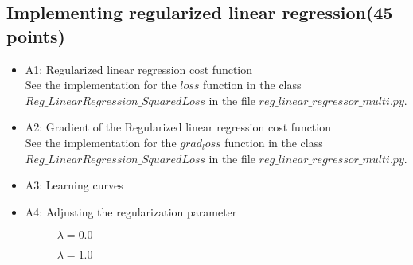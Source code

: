 \documentclass{article}
\begin{document}
\subsection{Implementing regularized linear regression(45 points)}
\begin{itemize}
    \item A1: Regularized linear regression cost function\\
    See the implementation for the $loss$ function in the class $Reg\_LinearRegression\_SquaredLoss$ in the file $reg\_linear\_regressor\_multi.py$.\\
    \item A2: Gradient of the Regularized linear regression cost function\\
    See the implementation for the $grad_loss$ function in the class $Reg\_LinearRegression\_SquaredLoss$ in the file $reg\_linear\_regressor\_multi.py$.\\
    \item A3: Learning curves\\
    \item A4: Adjusting the regularization parameter\\
    \begin{figure}[htbp]
    \centering
    \caption{$\lambda = 0.0$}
\end{figure}
\begin{figure}[htbp]
    \centering
    \caption{$\lambda = 1.0$}

\end{figure}
\end{itemize}
\end{document}

